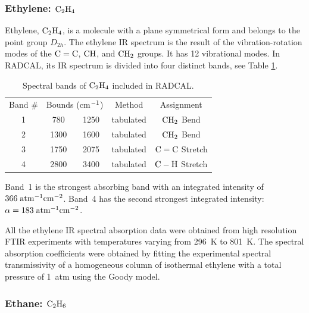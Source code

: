 \subsubsection{Ethylene: $\rm C_2H_4$}

Ethylene, $\rm C_2H_4$, is a molecule with a plane symmetrical form and belongs to the point group $D_{2h}$. The ethylene IR spectrum is the result of the vibration-rotation modes of the $\rm C=C$, $\rm CH$, and $\rm CH_2$ groups. It has 12 vibrational modes. In RADCAL, its IR spectrum is divided into four distinct bands, see Table \ref{Table::C2H4}.
\begin{table}[ht]
    \centering
    \caption{Spectral bands of $\rm C_2H_4$ included in RADCAL.}
    \vspace{0.1in}
    \label{Table::C2H4}
    \begin{tabular}{|c|c|c|c|c|}
      \hline
      Band \# & \multicolumn{2}{|l|}{Bounds (cm$\rm ^{-1}$) } & Method & Assignment \\
      \cline{1-5}
      1 & 780  & 1250 & tabulated &  $\rm CH_2$ Bend\\
      2 & 1300 & 1600 & tabulated &  $\rm CH_2$ Bend\\
      3 & 1750 & 2075 & tabulated &  $\rm C=C$  Stretch \\
      4 & 2800 & 3400 & tabulated &  $\rm C-H$  Stretch \\
      \hline
    \end{tabular}
\end{table}
Band~1 is the strongest absorbing band with an integrated intensity of $366\;\rm {atm^{-1}cm^{-2}}$. Band~4 has the second strongest integrated intensity: $\alpha = 183\;\rm {atm^{-1}cm^{-2}}$.

All the ethylene IR spectral absorption data were obtained from high resolution FTIR experiments with temperatures varying from 296~K to 801~K. The spectral absorption coefficients were obtained by fitting the experimental spectral transmissivity of a homogeneous column of isothermal ethylene with a total pressure of 1~atm using the Goody model.

\subsubsection{Ethane: $\rm C_2H_6$}

